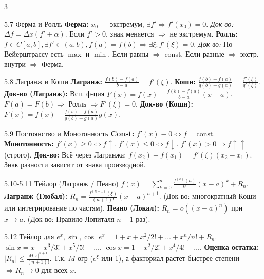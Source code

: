 \documentclass[8pt, a4paper, landscape]{extarticle}
\newcommand{\Ra}{\Rightarrow}
\begin{document}
\begin{multicols*}{3}
\begin{ticket}{5.7 Ферма и Ролль}
\textbf{Ферма:} $x_0$ — экстремум, $\exists f' \Ra f'(x_0) = 0$.
\textit{Док-во:} $\Delta f = \Delta x (f' + \alpha)$. Если $f' > 0$, знак меняется $\Ra$ не экстремум.
\textbf{Ролль:} $f \in C[a,b], \exists f' \in (a,b), f(a)=f(b) \Ra \exists \xi: f'(\xi)=0$.
\textit{Док-во:} По Вейерштрассу есть $\max$ и $\min$.
Если равны $\Ra$ const. Если разные $\Ra$ экстр. внутри $\Ra$ Ферма.
\end{ticket}

\begin{ticket}{5.8 Лагранж и Коши}
\textbf{Лагранж:} $\frac{f(b)-f(a)}{b-a} = f'(\xi)$.
\textbf{Коши:} $\frac{f(b)-f(a)}{g(b)-g(a)} = \frac{f'(\xi)}{g'(\xi)}$.
\tcblower
\textbf{Док-во (Лагранж):} Всп. ф-ция $F(x) = f(x) - \frac{f(b)-f(a)}{b-a}(x-a)$.
$F(a)=F(b) \Ra$ Ролль $\Ra F'(\xi)=0$.
\textbf{Док-во (Коши):} $F(x) = f(x) - \frac{f(b)-f(a)}{g(b)-g(a)} g(x)$.
\end{ticket}

\begin{ticket}{5.9 Постоянство и Монотонность}
\textbf{Const:} $f'(x) \equiv 0 \iff f = \text{const}$.
\textbf{Монотонность:}
$f'(x) \ge 0 \iff f \uparrow$.
$f'(x) \le 0 \iff f \downarrow$.
$f'(x) > 0 \Ra f \uparrow\uparrow$ (строго).
\tcblower
\textbf{Док-во:} Всё через Лагранжа: $f(x_2)-f(x_1) = f'(\xi)(x_2-x_1)$.
Знак разности зависит от знака производной.
\end{ticket}

\begin{ticket}{5.10-5.11 Тейлор (Лагранж / Пеано)}
$f(x) = \sum_{k=0}^n \frac{f^{(k)}(a)}{k!} (x-a)^k + R_n$.
\textbf{Лагранж (Глобал):} $R_n = \frac{f^{(n+1)}(\xi)}{(n+1)!}(x-a)^{n+1}$.
(Док-во: многократный Коши или интегрирование по частям).
\textbf{Пеано (Локал):} $R_n = o((x-a)^n)$ при $x \to a$.
(Док-во: Правило Лопиталя $n-1$ раз).
\end{ticket}

\begin{ticket}{5.12 Тейлор для $e^x, \sin, \cos$}
$e^x = 1 + x + x^2/2! + \dots + x^n/n! + R_n$.
$\sin x = x - x^3/3! + x^5/5! - \dots$.
$\cos x = 1 - x^2/2! + x^4/4! - \dots$.
\textbf{Оценка остатка:}
$|R_n| \le \frac{M |x|^{n+1}}{(n+1)!}$.
Т.к. $M$ огр ($e^\xi$ или 1), а факториал растет быстрее степени $\Ra R_n \to 0$ для всех $x$.
\end{ticket}






\end{multicols*}
\end{document}
